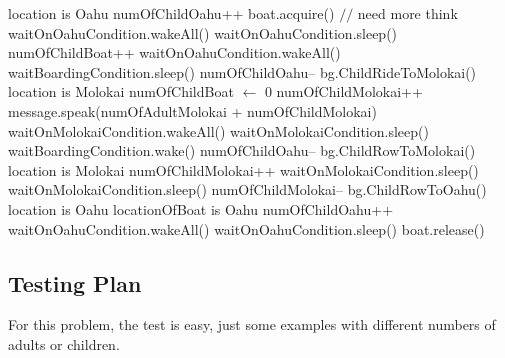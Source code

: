\documentclass{article}
\begin{document}
\begin{algorithm}
    \begin{algorithmic}
        \State location is Oahu
        \State numOfChildOahu++
            \State boat.acquire()
                 $//$ need more think
                        \State waitOnOahuCondition.wakeAll()
                    \EndIf
                    \State waitOnOahuCondition.sleep()
                \EndWhile
                \State numOfChildBoat++
                    \State waitOnOahuCondition.wakeAll()
                    \State waitBoardingCondition.sleep()
                    \State numOfChildOahu--
                    \State bg.ChildRideToMolokai()
                    \State location is Molokai
                    \State numOfChildBoat $\leftarrow$ 0
                    \State numOfChildMolokai++
                    \State message.speak(numOfAdultMolokai + numOfChildMolokai)
                    \State waitOnMolokaiCondition.wakeAll()
                    \State waitOnMolokaiCondition.sleep()
                \Else
                    \State waitBoardingCondition.wake()
                    \State numOfChildOahu--
                    \State bg.ChildRowToMolokai()
                    \State location is Molokai
                    \State numOfChildMolokai++
                    \State waitOnMolokaiCondition.sleep()
                \EndIf
            \Else
                    \State waitOnMolokaiCondition.sleep()
                \EndWhile
                \State numOfChildMolokai--
                \State bg.ChildRowToOahu()
                \State location is Oahu
                \State locationOfBoat is Oahu
                \State numOfChildOahu++
                \State waitOnOahuCondition.wakeAll()
                \State waitOnOahuCondition.sleep()
            \EndIf
            \State boat.release()
        \EndWhile
    \EndProcedure
    \end{algorithmic}
\end{algorithm}

\subsection{Testing Plan}

For this problem, the test is easy, just some examples with different numbers of adults or children.
\end{document}
